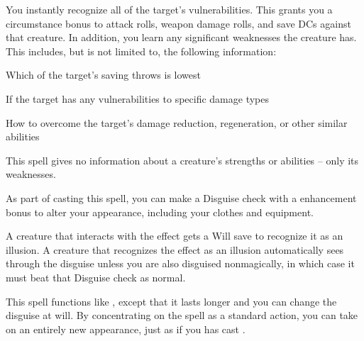 \spellrng{\rngmed}
\begin{spelleffect}
  You instantly recognize all of the target's vulnerabilities. This grants you a  circumstance bonus to attack rolls, weapon damage rolls, and save DCs against that creature. In addition, you learn any significant weaknesses the creature has. This includes, but is not limited to, the following information:
  \begin{itemize*}
    \item Which of the target's saving throws is lowest
    \item If the target has any vulnerabilities to specific damage types
    \item How to overcome the target's damage reduction, regeneration, or other similar abilities
  \end{itemize*}
\end{spelleffect}
\begin{spellnotes}
  This spell gives no information about a creature's strengths or abilities -- only its weaknesses.
\end{spellnotes}

\spellrng{\rngpers}
\begin{spelleffect}
    As part of casting this spell, you can make a Disguise check with a  enhancement bonus to alter your appearance, including your clothes and equipment.
\end{spelleffect}
\begin{spellnotes}
  A creature that interacts with the effect gets a Will save to recognize it as an illusion. A creature that recognizes the effect as an illusion automatically sees through the disguise unless you are also disguised nonmagically, in which case it must beat that Disguise check as normal.
\end{spellnotes}

\begin{spelleffect}
  This spell functions like , except that it lasts longer and you can change the disguise at will. By concentrating on the spell as a standard action, you can take on an entirely new appearance, just as if you has cast . 
\end{spelleffect}


